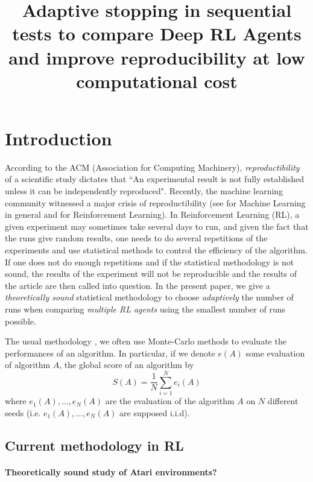 \documentclass{article}
\title{Adaptive stopping in sequential tests to compare Deep RL Agents and improve reproducibility at low computational cost}
\date{}
\theoremstyle{plain}
\theoremstyle{remark}
\newcommand{\1}{\mathbbm{1}}
\newcommand{\todoT}[1]{\todo[inline,color=blue!40]{{\textbf{T:}~}#1}}
\numberwithin{equation}{section}
\begin{document}
\maketitle
\section{Introduction}
According to the ACM (Association for Computing Machinery), \textit{reproductibility} of a scientific study dictates that   ``An experimental result is not fully established unless it can be independently reproduced". Recently, the machine learning community witnessed a major crisis of reproductibility (see \cite{pineau2021improving} for Machine Learning in general and \cite{agarwal2021deep,colas2018many,colas2019hitchhiker} for Reinforcement Learning). In Reinforcement Learning (RL), a given experiment may sometimes take several days to run, and given the fact that the runs give random results, one needs to do several repetitions of the experiments and use statistical methods to control the efficiency of the algorithm. If one does not do enough repetitions and if the statistical methodology is not sound, the results of the experiment will not be reproducible and the results of the article are then called into question. In the present paper, we give a \textit{theoretically sound} statistical methodology to choose \textit{adaptively} the number of runs when comparing \textit{multiple RL agents} using the smallest number of runs possible.

\todoT{Continue introduction}

The usual methodology , we often use Monte-Carlo methods to evaluate the performances of an algorithm. In particular, if we denote $e(A)$ some evaluation of algorithm $A$, the global score of an algorithm by
$$S(A)=\frac{1}{N}\sum_{i=1}^N e_i(A) $$
where $e_1(A), \dots,e_N(A)$ are the evaluation of the algorithm $A$ on $N$ different seeds (i.e. $e_1(A),\dots,e_N(A)$ are supposed i.i.d).

\subsection{Current methodology in RL}
\paragraph{Theoretically sound study of Atari environments?}
\end{document}
